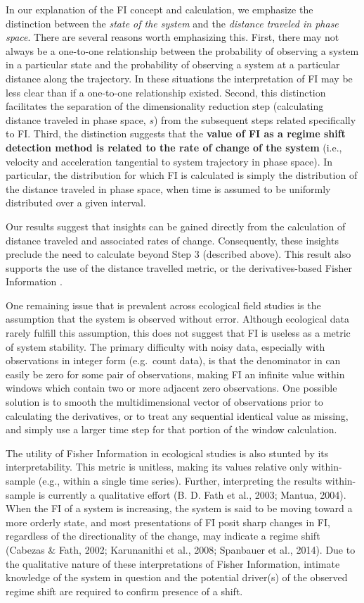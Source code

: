 \documentclass[12pt,twoside,openany]{reedthesis}
\begin{document}
In our explanation of the FI concept and calculation, we emphasize the
distinction between the \emph{state of the system} and the
\emph{distance traveled in phase space}. There are several reasons worth
emphasizing this. First, there may not always be a one-to-one
relationship between the probability of observing a system in a
particular state and the probability of observing a system at a
particular distance along the trajectory. In these situations the
interpretation of FI may be less clear than if a one-to-one relationship
existed. Second, this distinction facilitates the separation of the
dimensionality reduction step (calculating distance traveled in phase
space, \(s\)) from the subsequent steps related specifically to FI.
Third, the distinction suggests that the \textbf{value of FI as a regime
shift detection method is related to the rate of change of the system}
(i.e., velocity and acceleration tangential to system trajectory in
phase space). In particular, the distribution for which FI is calculated
is simply the distribution of the distance traveled in phase space, when
time is assumed to be uniformly distributed over a given interval.

Our results suggest that insights can be gained directly from the
calculation of distance traveled and associated rates of change.
Consequently, these insights preclude the need to calculate beyond Step
3 (described above). This result also supports the use of the distance
travelled metric, or the derivatives-based Fisher Information
\label{eq:fiDerivs}.

One remaining issue that is prevalent across ecological field studies is
the assumption that the system is observed without error. Although
ecological data rarely fulfill this assumption, this does not suggest
that FI is useless as a metric of system stability. The primary
difficulty with noisy data, especially with observations in integer form
(e.g.~count data), is that the denominator in can easily be zero for
some pair of observations, making FI an infinite value within windows
which contain two or more adjacent zero observations. One possible
solution is to smooth the multidimensional vector of observations prior
to calculating the derivatives, or to treat any sequential identical
value as missing, and simply use a larger time step for that portion of
the window calculation.

The utility of Fisher Information in ecological studies is also stunted
by its interpretability. This metric is unitless, making its values
relative only within-sample (e.g., within a single time series).
Further, interpreting the results within-sample is currently a
qualitative effort (B. D. Fath et al., 2003; Mantua, 2004). When the FI
of a system is increasing, the system is said to be moving toward a more
orderly state, and most presentations of FI posit sharp changes in FI,
regardless of the directionality of the change, may indicate a regime
shift (Cabezas \& Fath, 2002; Karunanithi et al., 2008; Spanbauer et
al., 2014). Due to the qualitative nature of these interpretations of
Fisher Information, intimate knowledge of the system in question and the
potential driver(s) of the observed regime shift are required to confirm
presence of a shift.
\end{document}
